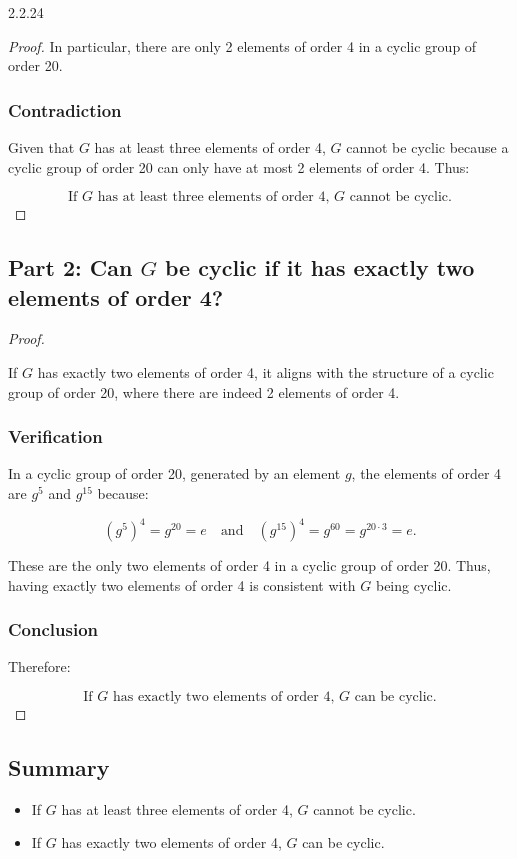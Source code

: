 \documentclass[12pt]{amsart}
\theoremstyle{definition}
\numberwithin{equation}{section}
\begin{document}
\begin{exercise}{2.2.24}
\begin{proof}
    In particular, there are only 2 elements of order 4 in a cyclic group of order 20.
    
    \subsubsection*{Contradiction}
    Given that \(G\) has at least three elements of order 4, \(G\) cannot be cyclic because a cyclic group of order 20 can only have at most 2 elements of order 4. Thus:
    
    \[
    \text{If \(G\) has at least three elements of order 4, \(G\) cannot be cyclic.}
    \]
    
    \end{proof}
    
    \subsection*{Part 2: Can \(G\) be cyclic if it has exactly two elements of order 4?}
    
    \begin{proof} \( \)
    
    If \(G\) has exactly two elements of order 4, it aligns with the structure of a cyclic group of order 20, where there are indeed 2 elements of order 4.
    
    \subsubsection*{Verification}
    In a cyclic group of order 20, generated by an element \(g\), the elements of order 4 are \(g^5\) and \(g^{15}\) because:
    
    \[
    (g^5)^4 = g^{20} = e \quad \text{and} \quad (g^{15})^4 = g^{60} = g^{20 \cdot 3} = e.
    \]
    
    These are the only two elements of order 4 in a cyclic group of order 20. Thus, having exactly two elements of order 4 is consistent with \(G\) being cyclic.
    
    \subsubsection*{Conclusion}
    Therefore:
    
    \[
    \text{If \(G\) has exactly two elements of order 4, \(G\) can be cyclic.}
    \]
    
    \end{proof}
    
    \subsection*{Summary}
    
    \begin{itemize}
        \item If \(G\) has at least three elements of order 4, \(G\) cannot be cyclic.
        \item If \(G\) has exactly two elements of order 4, \(G\) can be cyclic.
    \end{itemize}
    
    \end{exercise}
    \newpage
    
\end{document}
